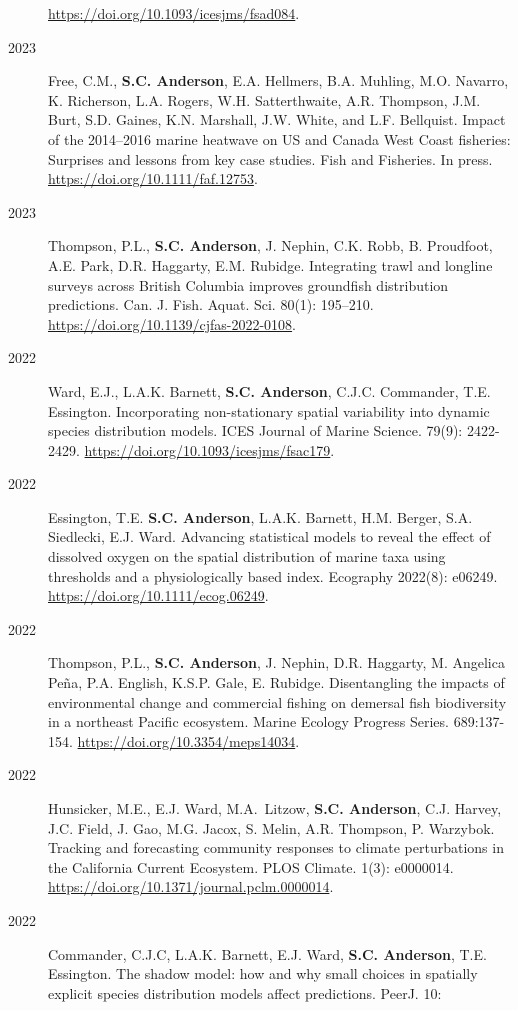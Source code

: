 \begin{description}
\url{https://doi.org/10.1093/icesjms/fsad084}.
\item[2023]
Free, C.M., \textbf{S.C. Anderson}, E.A. Hellmers, B.A. Muhling, M.O.
Navarro, K. Richerson, L.A. Rogers, W.H. Satterthwaite, A.R. Thompson,
J.M. Burt, S.D. Gaines, K.N. Marshall, J.W. White, and L.F. Bellquist.
Impact of the 2014--2016 marine heatwave on US and Canada West Coast
fisheries: Surprises and lessons from key case studies. Fish and
Fisheries. In press. \url{https://doi.org/10.1111/faf.12753}.
\item[2023]
Thompson, P.L., \textbf{S.C. Anderson}, J. Nephin, C.K. Robb, B.
Proudfoot, A.E. Park, D.R. Haggarty, E.M. Rubidge. Integrating trawl and
longline surveys across British Columbia improves groundfish
distribution predictions. Can. J. Fish. Aquat. Sci. 80(1): 195--210.
\url{https://doi.org/10.1139/cjfas-2022-0108}.
\item[2022]
Ward, E.J., L.A.K. Barnett, \textbf{S.C. Anderson}, C.J.C. Commander,
T.E. Essington. Incorporating non-stationary spatial variability into
dynamic species distribution models. ICES Journal of Marine Science.
79(9): 2422-2429. \url{https://doi.org/10.1093/icesjms/fsac179}.
\item[2022]
Essington, T.E. \textbf{S.C. Anderson}, L.A.K. Barnett, H.M. Berger,
S.A. Siedlecki, E.J. Ward. Advancing statistical models to reveal the
effect of dissolved oxygen on the spatial distribution of marine taxa
using thresholds and a physiologically based index. Ecography 2022(8):
e06249. \url{https://doi.org/10.1111/ecog.06249}.
\item[2022]
Thompson, P.L., \textbf{S.C. Anderson}, J. Nephin, D.R. Haggarty, M.
Angelica Peña, P.A. English, K.S.P. Gale, E. Rubidge. Disentangling the
impacts of environmental change and commercial fishing on demersal fish
biodiversity in a northeast Pacific ecosystem. Marine Ecology Progress
Series. 689:137-154. \url{https://doi.org/10.3354/meps14034}.
\item[2022]
Hunsicker, M.E., E.J. Ward, M.A.\ Litzow, \textbf{S.C. Anderson}, C.J.
Harvey, J.C. Field, J. Gao, M.G. Jacox, S. Melin, A.R. Thompson, P.
Warzybok. Tracking and forecasting community responses to climate
perturbations in the California Current Ecosystem. PLOS Climate. 1(3):
e0000014. \url{https://doi.org/10.1371/journal.pclm.0000014}.
\item[2022]
Commander, C.J.C, L.A.K. Barnett, E.J. Ward, \textbf{S.C. Anderson},
T.E. Essington. The shadow model: how and why small choices in spatially
explicit species distribution models affect predictions. PeerJ. 10:

\end{description}
